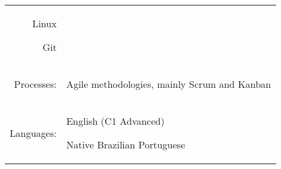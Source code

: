 \documentclass[a4paper,12pt]{article}
\begin{document}
\begin{tabular}{rp{15.2cm}}
\begin{itemize*}[label=\Large\textbullet]
    \item Linux
    \item Git
\end{itemize*}\\
\raggedleft Processes:
& \begin{itemize*}[label=\Large\textbullet]
    \item Agile methodologies, mainly Scrum and Kanban
\end{itemize*}\\
\raggedleft Languages:
& \begin{itemize*}[label=\Large\textbullet]
    \item English (C1 Advanced)
    \item Native Brazilian Portuguese
\end{itemize*}\\
\end{tabular}
\end{document}
